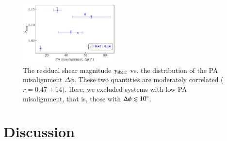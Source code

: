 \documentclass{aa}
\newcommand{\newedit}[1]{{#1}} %
\begin{document}
\begin{figure}[h]
  \centering
  \includegraphics[width=0.45\textwidth]{figures/gamma_shear_vs_pa_offset.pdf}
  \caption{\newedit{The residual shear magnitude \(\gamma_{\rm shear}\) vs. the distribution of the PA misalignment $\Delta \phi$. These two quantities are moderately correlated ($r=0.47\pm14)$. Here, we excluded systems with low PA misalignment, that is, those with $\Delta \phi \lesssim 10 ^\circ $.}}
  \label{fig:gamma_shear_vs_pa_offset}
\end{figure}



\section{Discussion} 
\label{sec:discussion}






\end{document}
